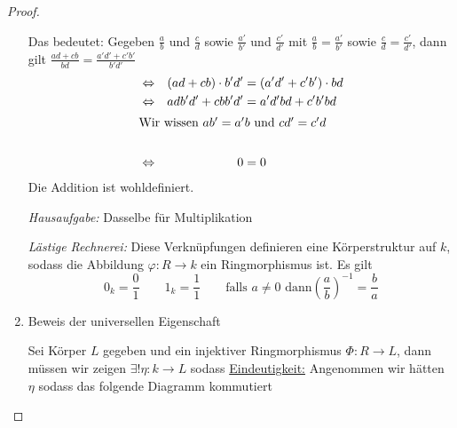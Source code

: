 \documentclass[a4paper,12pt,numbers=noenddot,parskip=full]{scrartcl}
\newcommand{\heading}{\underline}
\theoremstyle{dotless}
\theoremstyle{remark}
\begin{document}
\begin{proof}
\begin{enumerate}
			Das bedeutet: Gegeben $\frac{a}{b}$ und $\frac{c}{d}$ sowie $\frac{a'}{b'}$ und $\frac{c'}{d'}$ mit $\frac{a}{b} = \frac{a'}{b'}$ sowie $\frac{c}{d} = \frac{c'}{d'}$, dann gilt $\frac{ad + cb}{bd} = \frac{a'd' + c'b'}{b'd'}$
			\begin{align*}
				&\Leftrightarrow& (ad + cb) \cdot b'd' &= (a'd' + c'b') \cdot bd \\
				&\Leftrightarrow& adb'd' + cbb'd' &= a'd'bd + c'b'bd \\
				\intertext{Wir wissen $ab' = a'b$ und $cd' = c'd$} \\
				&\Leftrightarrow& 0 &= 0
			\end{align*}
			Die Addition ist wohldefiniert.
			
			\textit{Hausaufgabe:} Dasselbe für Multiplikation
			
			\textit{Lästige Rechnerei:} Diese Verknüpfungen definieren eine Körperstruktur auf $k$, sodass die Abbildung $\varphi: R \to k$ ein Ringmorphismus ist. Es gilt
			\begin{equation*}
				0_k = \frac01 \qquad 1_k = \frac11 \qquad \text{falls $a \neq 0$ dann} \left( \frac{a}{b} \right)^{-1} = \frac{b}{a}
			\end{equation*}
			
			\item Beweis der universellen Eigenschaft
			
			Sei Körper $L$ gegeben und ein injektiver Ringmorphismus $\Phi: R \to L$, dann müssen wir zeigen $\exists! \eta: k \to L$ sodass \textellipsis
			\heading{Eindeutigkeit:} Angenommen wir hätten $\eta$ sodass das folgende Diagramm kommutiert
			\begin{center}
\end{center}
\end{enumerate}
\end{proof}
\end{document}
